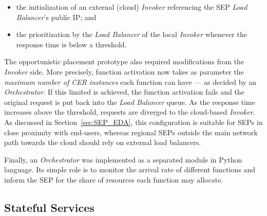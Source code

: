 \begin{itemize}
    \item the initialization of an external (cloud) \textit{Invoker} referencing the SEP \textit{Load Balancer}'s public IP; and
    
    \item the prioritization by the \textit{Load Balancer} of the local \textit{Invoker} whenever the response time is below a threshold. %
\end{itemize}

The opportunistic placement prototype also required modifications from the \textit{Invoker} side. More precisely, function activation now takes as parameter the \textit{maximum number of CER instances} each function can have --- as decided by an \textit{Orchestrator}. If this limited is achieved, the function activation fails and the original request is put back into the \textit{Load Balancer} queue. As the response time increases above the threshold, requests are diverged 
to the cloud-based \textit{Invoker}. 
As discussed in Section~\ref{sec:SEP_EDA}, this configuration is suitable for SEPs in close proximity with end-users, whereas regional SEPs outside the main network path towards the cloud should rely on external load balancers. 

Finally, an \textit{Orchestrator} was implemented as a separated module in Python language. Its simple role is to monitor the arrival rate of different functions and inform the SEP for the share of resources each function may allocate. 






\subsection{Stateful Services}

